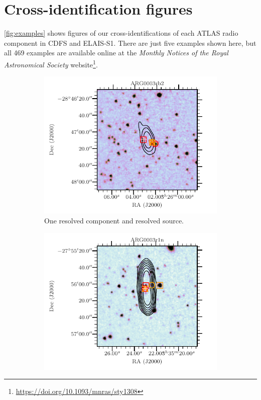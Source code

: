 \section{Cross-identification figures}\label{sec:atlas-xid-examples}

    \autoref{fig:examples} shows figures of our cross-identifications of each ATLAS radio component in CDFS and ELAIS-S1. There are just five examples shown here, but all 469 examples are available online at the \emph{Monthly Notices of the Royal Astronomical Society} website\footnote{\url{https://doi.org/10.1093/mnras/sty1308}}.


    \begin{figure}
        \centering
        \begin{subfigure}{0.45\textwidth}
            \includegraphics[width=\textwidth]{atlas-images/examples_all/example_sorted_2_0.pdf}
            \caption{One resolved component and resolved source.}
        \end{subfigure}
        \begin{subfigure}{0.45\textwidth}
            \includegraphics[width=\textwidth]{atlas-images/examples_all/example_sorted_3_454.pdf}

\end{subfigure}
\end{figure}

